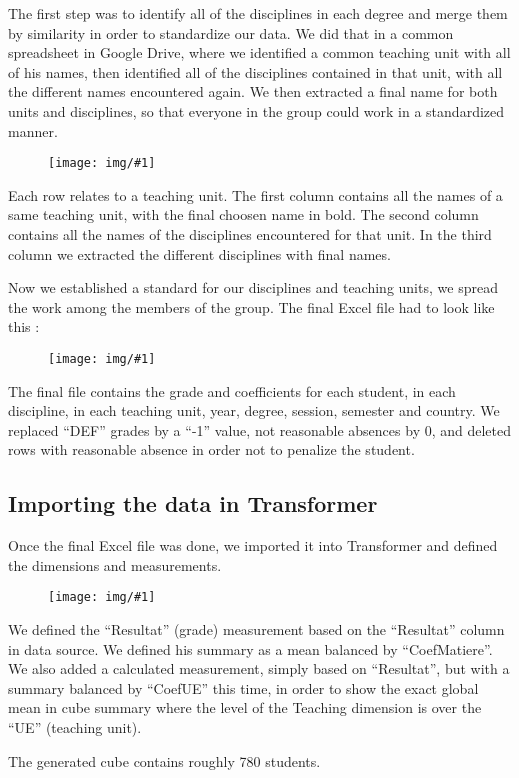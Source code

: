 \documentclass[11pt, a4paper]{article}
\newcommand\image[2]{
	\begin{figure}[H]
	\centering
	\texttt{[image: img/\#1]}
	\end{figure}
}
\begin{document}
   The first step was to identify all of the disciplines in each degree and merge them by similarity in order to standardize our data. We did that in a common spreadsheet in Google Drive, where we identified a common teaching unit with all of his names, then identified all of the disciplines contained in that unit, with all the different names encountered again. We then extracted a final name for both units and disciplines, so that everyone in the group could work in a standardized manner. 

    \image{matieres.png}{480px}

    Each row relates to a teaching unit. The first column contains all the names of a same teaching unit, with the final choosen name in bold. The second column contains all the names of the disciplines encountered for that unit. In the third column we extracted the different disciplines with final names.

    Now we established a standard for our disciplines and teaching units, we spread the work among the members of the group. The final Excel file had to look like this :

    \image{final.png}{480px}

    The final file contains the grade and coefficients for each student, in each discipline, in each teaching unit, year, degree, session, semester and country. We replaced “DEF” grades by a “-1” value, not reasonable absences by 0, and deleted rows with reasonable absence in order not to penalize the student. 

    \newpage

    \subsection{Importing the data in Transformer}

    Once the final Excel file was done, we imported it into Transformer and defined the dimensions and measurements.

    \image{transformer1.png}{300px}

    We defined the “Resultat” (grade) measurement based on the “Resultat” column in data source. We defined his summary as a mean balanced by “CoefMatiere”.
    We also added a calculated measurement, simply based on “Resultat”, but with a summary balanced by “CoefUE” this time, in order to show the exact global mean in cube summary where the level of the Teaching dimension is over the “UE” (teaching unit).

    The generated cube contains roughly 780 students.
    
\end{document}
